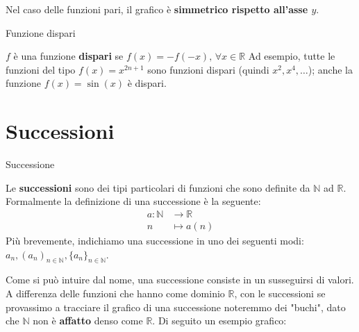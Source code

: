 \documentclass[12pt]{report}
\newcommand{\N}{\mathbb{N}}
\newcommand{\R}{\mathbb{R}}
\begin{document}
	Nel caso delle funzioni pari, il grafico è \textbf{simmetrico rispetto all'asse $y$}.
	
	\begin{definizione}{Funzione dispari}{}
		
		$f$ è una funzione \textbf{dispari} se $f(x) = -f(-x),\,\forall x \in \R$
		Ad esempio, tutte le funzioni del tipo $f(x) = x^{2n+1}$ sono funzioni dispari (quindi $x^2, x^4, \dots$); anche la funzione $f(x) = \sin(x)$ è dispari.
		
	\end{definizione}
	
	\chapter{Successioni}
	
	\begin{definizione}{Successione}{}
		
		Le \textbf{successioni} sono dei tipi particolari di funzioni che sono definite da $\N$ ad $\R$. Formalmente la definizione di una successione è la seguente:
		\[
		\begin{aligned}
			a: \N &\to \R\\
			n &\mapsto a(n)
		\end{aligned}
		\]
		Più brevemente, indichiamo una successione in uno dei seguenti modi: $a_n, (a_n)_{n \in \N}, \{a_n\}_{n \in \N}$.
		
	\end{definizione}
	
	Come si può intuire dal nome, una successione consiste in un susseguirsi di valori. A differenza delle funzioni che hanno come dominio $\R$, con le successioni se provassimo a tracciare il grafico di una successione noteremmo dei "buchi", dato che $\N$ non è \textbf{affatto} denso come $\R$.
	Di seguito un esempio grafico:
	
	\begin{center}
		
		
	\end{center}
	
\end{document}
